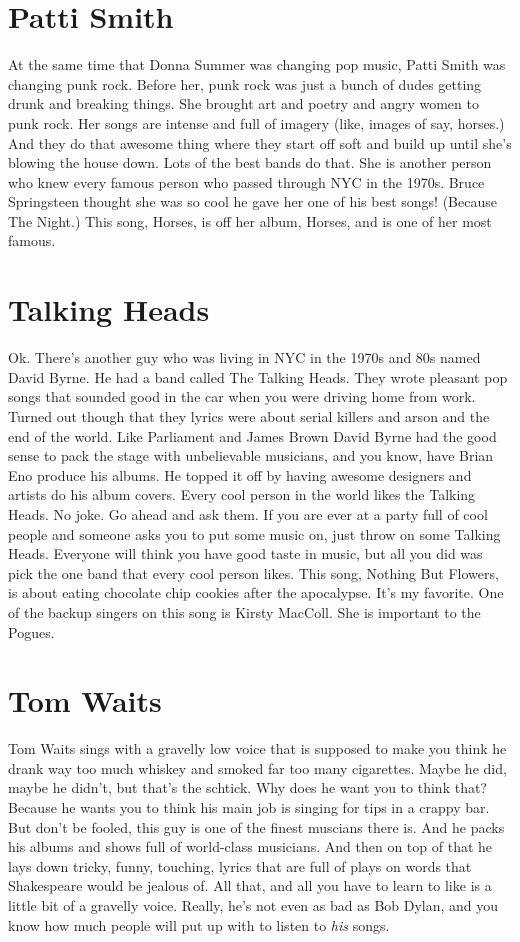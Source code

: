 \documentclass[letterpaper,12pt,single]{article}
\begin{document}
\section{Patti Smith}

At the same time that Donna Summer was changing pop music, Patti Smith was changing punk rock. Before her, punk rock was just a bunch of dudes getting drunk and breaking things. She brought art and poetry and angry women to punk rock. Her songs are intense and full of imagery (like, images of say, horses.) And they do that awesome thing where they start off soft and build up until she's blowing the house down. Lots of the best bands do that. She is another person who knew every famous person who passed through NYC in the 1970s. Bruce Springsteen thought she was so cool he gave her one of his best songs! (Because The Night.) This song, Horses, is off her album, Horses, and is one of her most famous.

\section{Talking Heads}

Ok. There's another guy who was living in NYC in the 1970s and 80s named David Byrne. He had a band called The Talking Heads. They wrote pleasant pop songs that sounded good in the car when you were driving home from work. Turned out though that they lyrics were about serial killers and arson and the end of the world. Like Parliament and James Brown David Byrne had the good sense to pack the stage with unbelievable musicians, and you know, have Brian Eno produce his albums. He topped it off by having awesome designers and artists do his album covers. Every cool person in the world likes the Talking Heads. No joke. Go ahead and ask them. If you are ever at a party full of cool people and someone asks you to put some music on, just throw on some Talking Heads. Everyone will think you have good taste in music, but all you did was pick the one band that every cool person likes. This song, Nothing But Flowers, is about eating chocolate chip cookies after the apocalypse. It's my favorite. One of the backup singers on this song is Kirsty MacColl. She is important to the Pogues.

\section{Tom Waits}

Tom Waits sings with a gravelly low voice that is supposed to make you think he drank way too much whiskey and smoked far too many cigarettes. Maybe he did, maybe he didn't, but that's the schtick. Why does he want you to think that? Because he wants you to think his main job is singing for tips in a crappy bar. But don't be fooled, this guy is one of the finest muscians there is. And he packs his albums and shows full of world-class musicians. And then on top of that he lays down tricky, funny, touching, lyrics that are full of plays on words that Shakespeare would be jealous of. All that, and all you have to learn to like is a little bit of a gravelly voice. Really, he's not even as bad as Bob Dylan, and you know how much people will put up with to listen to \emph{his} songs.
\end{document}
